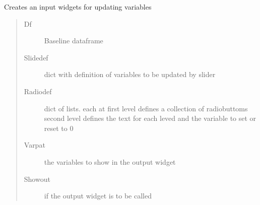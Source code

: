 \documentclass[letterpaper,10pt,english]{sphinxmanual}
\begin{document}
\begin{fulllineitems}
\label{\detokenize{jupyter/modeljupyter:modeljupyter.inputwidget}}
\pysigstartsignatures
{}
\pysigstopsignatures
\sphinxAtStartPar
Creates an input widgets for updating variables
\begin{quote}\begin{description}
\item[{Df}] \leavevmode
\sphinxAtStartPar
Baseline dataframe

\item[{Slidedef}] \leavevmode
\sphinxAtStartPar
dict with definition of variables to be updated by slider

\item[{Radiodef}] \leavevmode
\sphinxAtStartPar
dict of lists. each at first level defines a collection of radiobuttoms
second level defines the text for each leved and the variable to set or reset to 0

\item[{Varpat}] \leavevmode
\sphinxAtStartPar
the variables to show in the output widget

\item[{Showout}] \leavevmode
{} if the output widget is to be called

\end{description}\end{quote}

\end{fulllineitems}
\end{document}
